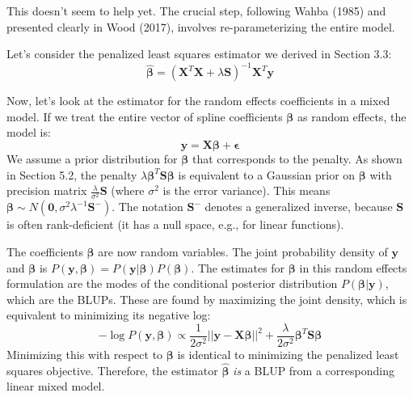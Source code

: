 \documentclass[11pt, a4paper]{article}
\begin{document}
This doesn't seem to help yet. The crucial step, following Wahba (1985) and presented clearly in Wood (2017), involves re-parameterizing the entire model.

Let's consider the penalized least squares estimator we derived in Section 3.3:
\[ \hat{\boldsymbol{\beta}} = (\mathbf{X}^T\mathbf{X} + \lambda\mathbf{S})^{-1}\mathbf{X}^T\mathbf{y} \]

Now, let's look at the estimator for the random effects coefficients in a mixed model. If we treat the entire vector of spline coefficients $\boldsymbol{\beta}$ as random effects, the model is:
\[ \mathbf{y} = \mathbf{X}\boldsymbol{\beta} + \boldsymbol{\epsilon} \]
We assume a prior distribution for $\boldsymbol{\beta}$ that corresponds to the penalty. As shown in Section 5.2, the penalty $\lambda \boldsymbol{\beta}^T \mathbf{S} \boldsymbol{\beta}$ is equivalent to a Gaussian prior on $\boldsymbol{\beta}$ with precision matrix $\frac{\lambda}{\sigma^2}\mathbf{S}$ (where $\sigma^2$ is the error variance). This means $\boldsymbol{\beta} \sim N(\mathbf{0}, \sigma^2 \lambda^{-1} \mathbf{S}^{-})$. The notation $\mathbf{S}^{-}$ denotes a generalized inverse, because $\mathbf{S}$ is often rank-deficient (it has a null space, e.g., for linear functions).

The coefficients $\boldsymbol{\beta}$ are now random variables. The joint probability density of $\mathbf{y}$ and $\boldsymbol{\beta}$ is $P(\mathbf{y}, \boldsymbol{\beta}) = P(\mathbf{y}|\boldsymbol{\beta})P(\boldsymbol{\beta})$. The estimates for $\boldsymbol{\beta}$ in this random effects formulation are the modes of the conditional posterior distribution $P(\boldsymbol{\beta}|\mathbf{y})$, which are the BLUPs. These are found by maximizing the joint density, which is equivalent to minimizing its negative log:
\[ -\log P(\mathbf{y}, \boldsymbol{\beta}) \propto \frac{1}{2\sigma^2}||\mathbf{y} - \mathbf{X}\boldsymbol{\beta}||^2 + \frac{\lambda}{2\sigma^2}\boldsymbol{\beta}^T\mathbf{S}\boldsymbol{\beta} \]
Minimizing this with respect to $\boldsymbol{\beta}$ is identical to minimizing the penalized least squares objective. Therefore, the estimator $\hat{\boldsymbol{\beta}}$ \textit{is} a BLUP from a corresponding linear mixed model.
\end{document}
